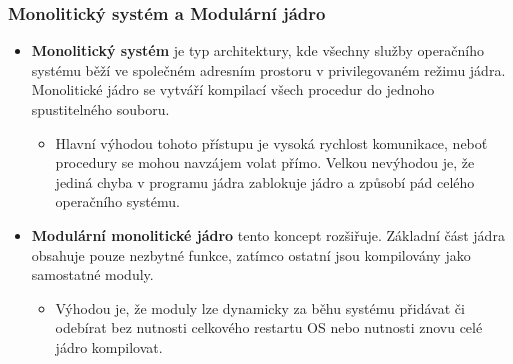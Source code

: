     \subsubsection{Monolitický systém a Modulární jádro}
            \begin{itemize}
                \item \textbf{Monolitický systém} je typ architektury, kde všechny služby operačního systému běží ve společném adresním prostoru v privilegovaném režimu jádra. Monolitické jádro se vytváří kompilací všech procedur do jednoho spustitelného souboru.
                \begin{itemize}
                    \item Hlavní výhodou tohoto přístupu je vysoká rychlost komunikace, neboť procedury se mohou navzájem volat přímo. Velkou nevýhodou je, že jediná chyba v programu jádra zablokuje jádro a způsobí pád celého operačního systému.
                \end{itemize}
            \end{itemize}
            \begin{itemize}
                \item \textbf{Modulární monolitické jádro} tento koncept rozšiřuje. Základní část jádra obsahuje pouze nezbytné funkce, zatímco ostatní jsou kompilovány jako samostatné moduly. 
                \begin{itemize}
                    \item Výhodou je, že moduly lze dynamicky za běhu systému přidávat či odebírat bez nutnosti celkového restartu OS nebo nutnosti znovu celé jádro kompilovat.
                \end{itemize}\textbf{}
            \end{itemize}

